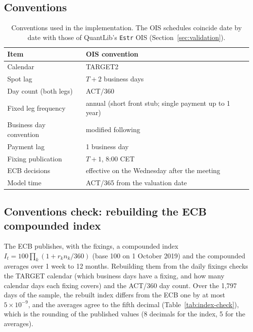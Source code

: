 \documentclass[11pt,a4paper]{article}
\theoremstyle{plain}
\theoremstyle{definition}
\newcommand{\estr}{\text{\texteuro STR}}
\begin{document}
\subsection{Conventions}
\begin{table}[htbp]
\centering
\begin{tabular}{@{}ll@{}}
\toprule
Item & \estr{} OIS convention \\
\midrule
Calendar & TARGET2 \\
Spot lag & $T+2$ business days \\
Day count (both legs) & ACT/360 \\
Fixed leg frequency & annual (short front stub; single payment up to 1 year) \\
Business day convention & modified following \\
Payment lag & 1 business day \\
Fixing publication & $T+1$, 8:00 CET \\
ECB decisions & effective on the Wednesday after the meeting \\
Model time & ACT/365 from the valuation date \\
\bottomrule
\end{tabular}
\caption{Conventions used in the implementation. The OIS schedules coincide date by date with those of QuantLib's \texttt{Estr} OIS (Section~\ref{sec:validation}).}
\label{tab:conventions}
\end{table}

\subsection{Conventions check: rebuilding the ECB compounded index}
The ECB publishes, with the fixings, a compounded \estr{} index $I_t=100\prod_k(1+r_kn_k/360)$ (base 100 on 1 October 2019) and the compounded averages over 1 week to 12 months. Rebuilding them from the daily fixings checks the TARGET calendar (which business days have a fixing, and how many calendar days each fixing covers) and the ACT/360 day count. Over the 1,797 days of the sample, the rebuilt index differs from the ECB one by at most $5\times10^{-9}$, and the averages agree to the fifth decimal (Table~\ref{tab:index-check}), which is the rounding of the published values (8 decimals for the index, 5 for the averages).
\end{document}
